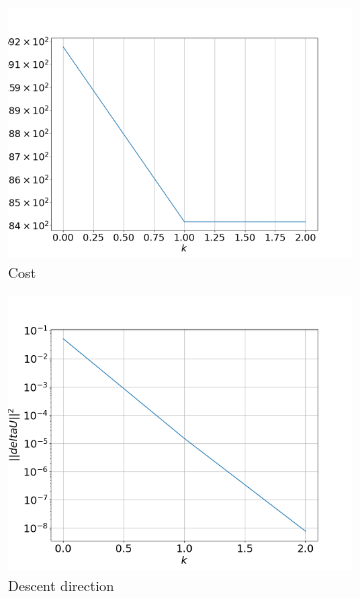 \begin{figure}
    \centering
    \begin{subfigure}[b]{0.49\textwidth}
        \centering
        \includegraphics[width=\textwidth]{figs/downward_cost_smooth.png}
        \caption{Cost}
        \label{fig:downward_cost_smooth}
    \end{subfigure}
    \hfill
    \begin{subfigure}[b]{0.49\textwidth}
        \centering
        \includegraphics[width=\textwidth]{figs/Downward_Descent_smooth.png}
        \caption{Descent direction}
        \label{fig:Downward_Descent_smooth}
    \end{subfigure}
    \caption{}
\end{figure}

